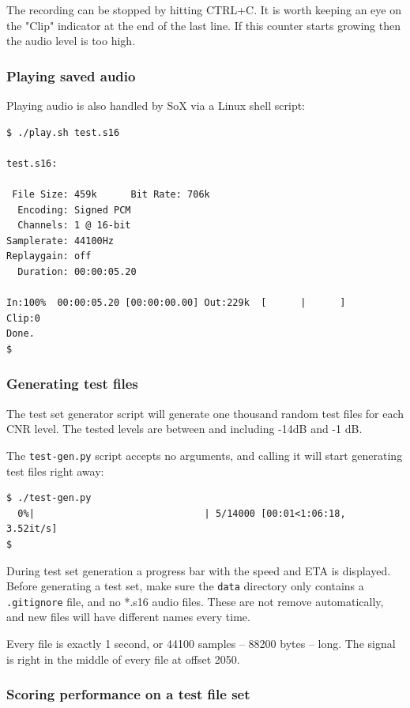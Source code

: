 \documentclass[a4paper]{article}
\begin{document}
The recording can be stopped by hitting CTRL+C. It is worth keeping an 
eye on the "Clip" indicator at the end of the last line. If this 
counter starts growing then the audio level is too high.

\subsubsection{Playing saved audio}

Playing audio is also handled by SoX via a Linux shell script:

\begin{lstlisting}
$ ./play.sh test.s16 

test.s16:

 File Size: 459k      Bit Rate: 706k
  Encoding: Signed PCM    
  Channels: 1 @ 16-bit   
Samplerate: 44100Hz      
Replaygain: off         
  Duration: 00:00:05.20  

In:100%  00:00:05.20 [00:00:00.00] Out:229k  [      |      ]     Clip:0    
Done.
$
\end{lstlisting}

\subsubsection{Generating test files}

The test set generator script will generate one thousand random test 
files for each CNR level. The tested levels are between and including
-14dB and -1 dB.

The \texttt{test-gen.py} script accepts no arguments, and calling it 
will start generating test files right away:

\begin{lstlisting}
$ ./test-gen.py 
  0%|                              | 5/14000 [00:01<1:06:18,  3.52it/s]
$
\end{lstlisting}

During test set generation a progress bar with the speed and ETA is 
displayed. Before generating a test set, make sure the \texttt{data} 
directory only contains a \texttt{.gitignore} file, and no *.s16 audio 
files. These are not remove automatically, and new files will have 
different names every time.

Every file is exactly 1 second, or 44100 samples -- 88200 bytes -- 
long. The signal is right in the middle of every file at offset 2050.

\subsubsection{Scoring performance on a test file set}
\end{document}
